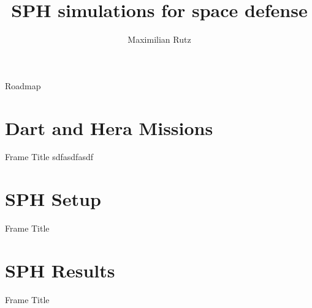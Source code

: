 \documentclass{beamer}
\title{SPH simulations for space defense}
\author{Maximilian Rutz}
\begin{document}
\begin{frame}[plain]
    \maketitle
\end{frame}
\begin{frame}[plain]{Roadmap}
\end{frame}
\section{Dart and Hera Missions}
\begin{frame}{Frame Title}
	sdfasdfasdf
\end{frame}
\section{SPH Setup}
\begin{frame}{Frame Title}
\end{frame}
\section{SPH Results}
\begin{frame}{Frame Title}
\end{frame}
\end{document}
